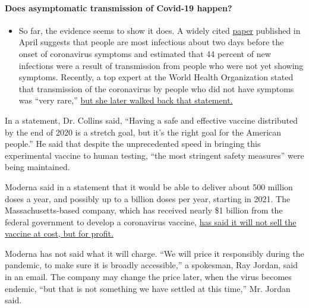 \begin{itemize}
{  \paragraph{Does asymptomatic transmission of Covid-19
  happen?}\label{does-asymptomatic-transmission-of-covid-19-happen}}

  \begin{itemize}
  \tightlist
  \item
    So far, the evidence seems to show it does. A widely cited
    \href{https://www.nature.com/articles/s41591-020-0869-5}{paper}
    published in April suggests that people are most infectious about
    two days before the onset of coronavirus symptoms and estimated that
    44 percent of new infections were a result of transmission from
    people who were not yet showing symptoms. Recently, a top expert at
    the World Health Organization stated that transmission of the
    coronavirus by people who did not have symptoms was ``very rare,''
    \href{https://www.nytimes.com/2020/06/09/world/coronavirus-updates.html?action=click\&pgtype=Article\&state=default\&region=MAIN_CONTENT_3\&context=storylines_faq\#link-1f302e21}{but
    she later walked back that statement.}
  \end{itemize}
\end{itemize}

In a statement, Dr. Collins said, ``Having a safe and effective vaccine
distributed by the end of 2020 is a stretch goal, but it's the right
goal for the American people.'' He said that despite the unprecedented
speed in bringing this experimental vaccine to human testing, ``the most
stringent safety measures'' were being maintained.

Moderna said in a statement that it would be able to deliver about 500
million doses a year, and possibly up to a billion doses per year,
starting in 2021. The Massachusetts-based company, which has received
nearly \$1 billion from the federal government to develop a coronavirus
vaccine,
\href{https://www.nytimes.com/2020/07/21/health/covid-19-vaccine-coronavirus-moderna-pfizer.html}{has
said it will not sell the vaccine at cost, but for profit.}

Moderna has not said what it will charge. ``We will price it responsibly
during the pandemic, to make sure it is broadly accessible,'' a
spokesman, Ray Jordan, said in an email. The company may change the
price later, when the virus becomes endemic, ``but that is not something
we have settled at this time,'' Mr. Jordan said.

